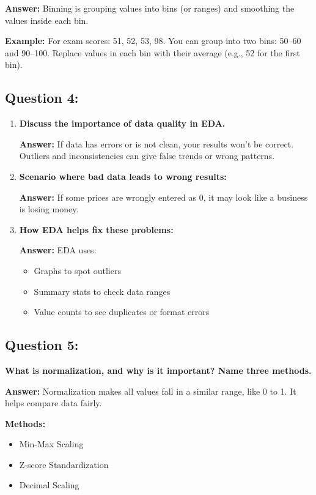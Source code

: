 \documentclass{article}
\begin{document}
\textbf{Answer:} Binning is grouping values into bins (or ranges) and smoothing the values inside each bin. 

\textbf{Example:} For exam scores: 51, 52, 53, 98. You can group into two bins: 50–60 and 90–100. Replace values in each bin with their average (e.g., 52 for the first bin).

\subsection*{Question 4:}
\begin{enumerate}[label=(\alph*)]
    \item \textbf{Discuss the importance of data quality in EDA.}

    \textbf{Answer:} If data has errors or is not clean, your results won’t be correct. Outliers and inconsistencies can give false trends or wrong patterns.

    \item \textbf{Scenario where bad data leads to wrong results:}

    \textbf{Answer:} If some prices are wrongly entered as 0, it may look like a business is losing money.

    \item \textbf{How EDA helps fix these problems:}

    \textbf{Answer:} EDA uses:
    \begin{itemize}
        \item Graphs to spot outliers
        \item Summary stats to check data ranges
        \item Value counts to see duplicates or format errors
    \end{itemize}
\end{enumerate}

\subsection*{Question 5:}
\textbf{What is normalization, and why is it important? Name three methods.}

\textbf{Answer:} Normalization makes all values fall in a similar range, like 0 to 1. It helps compare data fairly.

\textbf{Methods:}
\begin{itemize}
    \item Min-Max Scaling
    \item Z-score Standardization
    \item Decimal Scaling
\end{itemize}
\end{document}
